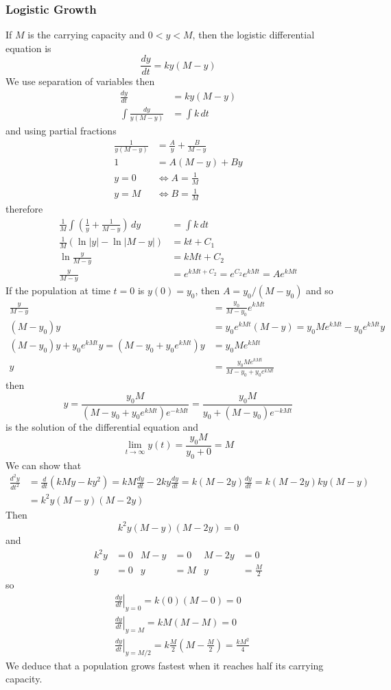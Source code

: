 \subsubsection{Logistic Growth}
If \(M\) is the carrying capacity and \(0<y<M\), then the logistic
differential equation is
\[\frac{dy}{dt}=ky(M-y)\]
We use separation of variables then
\begin{align*}
    \frac{dy}{dt} &= ky(M-y) \\
    \int\frac{dy}{y(M-y)} &= \int k\,dt
\end{align*}
and using partial fractions
\begin{align*}
    \frac{1}{y(M-y)} &= \frac{A}{y}+\frac{B}{M-y} \\
    1 &= A(M-y)+By \\
    y=0 &\iff A=\frac{1}{M} \\
    y=M &\iff B=\frac{1}{M}
\end{align*}
therefore
\begin{align*}
    \frac{1}{M}\int\left(\frac{1}{y}+\frac{1}{M-y}\right)\,dy &= \int k\,dt \\
    \frac{1}{M}(\ln|y|-\ln|M-y|) &= kt+C_1 \\
    \ln\frac{y}{M-y} &= kMt+C_2 \\
    \frac{y}{M-y} &= e^{kMt+C_2}=e^{C_2}e^{kMt}=Ae^{kMt}
\end{align*}
If the population at time \(t=0\) is \(y(0)=y_0\),
then \(A=y_0/(M-y_0)\) and so
\begin{align*}
    \frac{y}{M-y} &= \frac{y_0}{M-y_0}e^{kMt} \\
    (M-y_0)y &= y_0e^{kMt}(M-y)=y_0Me^{kMt}-y_0e^{kMt}y \\
    (M-y_0)y+y_0e^{kMt}y=(M-y_0+y_0e^{kMt})y &= y_0Me^{kMt} \\
    y &= \frac{y_0Me^{kMt}}{M-y_0+y_0e^{kMt}}
\end{align*}
then
\[y=\frac{y_0M}{(M-y_0+y_0e^{kMt})e^{-kMt}}=\frac{y_0M}{y_0+(M-y_0)e^{-kMt}}\]
is the solution of the differential equation and
\[\lim_{t\to\infty}y(t)=\frac{y_0M}{y_0+0}=M\]
We can show that
\begin{align*}
    \frac{d^2y}{dt^2} &= \frac{d}{dt}(kMy-ky^2)=kM\frac{dy}{dt}-2ky\frac{dy}{dt}
    =k(M-2y)\frac{dy}{dt}=k(M-2y)ky(M-y) \\
    &= k^2y(M-y)(M-2y)
\end{align*}
Then
\[k^2y(M-y)(M-2y)=0\]
and
\begin{align*}
    k^2y &= 0 & M-y &= 0 & M-2y &= 0 \\
    y &= 0 & y &= M & y &= \frac{M}{2}
\end{align*}
so
\begin{align*}
    &\left.\frac{dy}{dt}\right|_{y=0}=k(0)(M-0)=0 \\
    &\left.\frac{dy}{dt}\right|_{y=M}=kM(M-M)=0 \\
    &\left.\frac{dy}{dt}\right|_{y=M/2}=k\frac{M}{2}\left(M-\frac{M}{2}\right)
    =\frac{kM^2}{4}
\end{align*}
We deduce that a population grows fastest when it reaches half its carrying
capacity.

